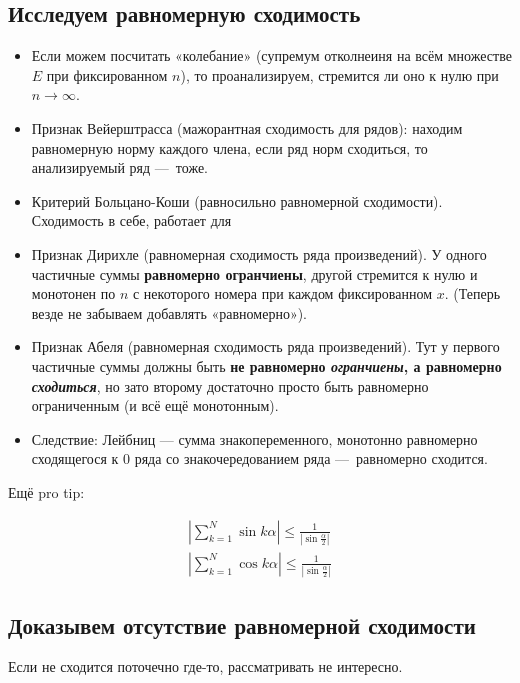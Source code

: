 \documentclass[12pt, a4paper]{article}
\begin{document}
\subsection{Исследуем равномерную сходимость}

\begin{itemize}
	\item Если можем посчитать «колебание» (супремум отколнеиня на всём множестве $E$ при фиксированном $n$), 
  то проанализируем, стремится ли оно к нулю при $n \to \infty$.
	\item Признак Вейерштрасса (мажорантная сходимость для рядов): находим равномерную норму каждого члена, если ряд норм сходиться, то анализируемый ряд — тоже.
	\item Критерий Больцано-Коши (равносильно равномерной сходимости). Сходимость в себе, работает для
	\item Признак Дирихле (равномерная сходимость ряда произведений). У одного частичные суммы \textbf{равномерно огранчиены}, другой стремится к нулю и монотонен по $n$ с некоторого номера при каждом фиксированном $x$. 
  (Теперь везде не забываем добавлять «равномерно»).
  \item Признак Абеля (равномерная сходимость ряда произведений). 
  Тут у первого частичные суммы должны быть \textbf{не равномерно \textit{огранчиены}, а равномерно \textit{сходиться}}, 
  но зато второму достаточно просто быть равномерно ограниченным (и всё ещё монотонным).
  \item Следствие: Лейбниц — сумма знакопеременного, монотонно равномерно сходящегося к 0 ряда со знакочередованием ряда — равномерно сходится.
\end{itemize}

Ещё pro tip: 

\begin{gather}
  \left| \sum_{k = 1}^N \sin {k\alpha} \right| \leqslant \frac{1}{\left| \sin {\frac{\alpha}{2}} \right|} \\
  \left| \sum_{k = 1}^N \cos {k\alpha} \right| \leqslant \frac{1}{\left| \sin {\frac{\alpha}{2}} \right|}
\end{gather}

\subsection{Доказывем отсутствие равномерной сходимости}

Если не сходится поточечно где-то, рассматривать не интересно.
\end{document}
